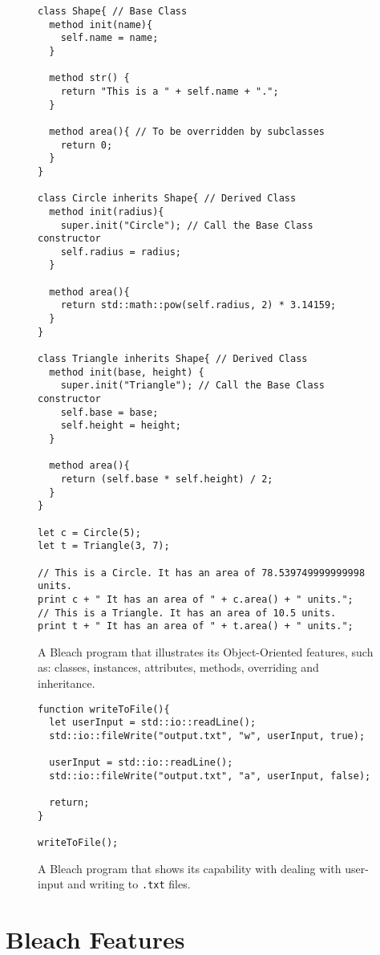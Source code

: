 \begin{figure}
    \centering
    \begin{lstlisting}
class Shape{ // Base Class
  method init(name){
    self.name = name;
  }

  method str() {
    return "This is a " + self.name + ".";
  }

  method area(){ // To be overridden by subclasses
    return 0;
  }
}

class Circle inherits Shape{ // Derived Class
  method init(radius){
    super.init("Circle"); // Call the Base Class constructor
    self.radius = radius;
  }

  method area(){
    return std::math::pow(self.radius, 2) * 3.14159;
  }
}

class Triangle inherits Shape{ // Derived Class
  method init(base, height) {
    super.init("Triangle"); // Call the Base Class constructor
    self.base = base;
    self.height = height;
  }

  method area(){
    return (self.base * self.height) / 2;
  }
}

let c = Circle(5);
let t = Triangle(3, 7);

// This is a Circle. It has an area of 78.539749999999998 units.
print c + " It has an area of " + c.area() + " units.";
// This is a Triangle. It has an area of 10.5 units.
print t + " It has an area of " + t.area() + " units.";
    \end{lstlisting}
    \caption{A Bleach program that illustrates its Object-Oriented features, such as: classes, instances, attributes, methods, overriding and inheritance.}
\end{figure}

\begin{figure}
    \centering
    \begin{lstlisting}
function writeToFile(){
  let userInput = std::io::readLine();
  std::io::fileWrite("output.txt", "w", userInput, true);

  userInput = std::io::readLine();
  std::io::fileWrite("output.txt", "a", userInput, false);

  return;
}

writeToFile();
    \end{lstlisting}
    \caption{A Bleach program that shows its capability with dealing with user-input and writing to \texttt{.txt} files.}
\end{figure}

\section{Bleach Features}

